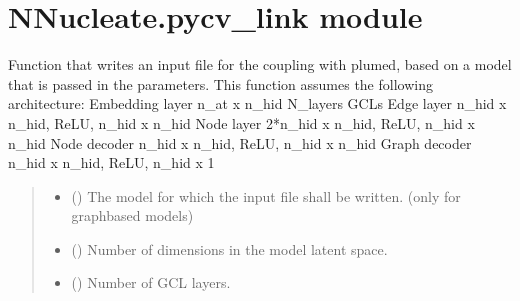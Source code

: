 \documentclass[a4paper,10pt,english]{report}
\begin{document}
\chapter{NNucleate.pycv\_link module}
\label{\detokenize{NNucleate:module-NNucleate.pycv_link}}\label{\detokenize{NNucleate:nnucleate-pycv-link-module}}

\begin{fulllineitems}
\label{\detokenize{NNucleate:NNucleate.pycv_link.write_cv_link}}
\pysigstartsignatures
{}
\pysigstopsignatures
\sphinxAtStartPar
Function that writes an input file for the coupling with plumed, based on a model that is passed in the parameters.
This function assumes the following architecture:
\sphinxhyphen{} Embedding layer n\_at x n\_hid
\sphinxhyphen{} N\_layers GCLs
\sphinxhyphen{} Edge layer n\_hid x n\_hid, ReLU, n\_hid x n\_hid
\sphinxhyphen{} Node layer 2*n\_hid x n\_hid, ReLU, n\_hid x n\_hid
\sphinxhyphen{} Node decoder n\_hid x n\_hid, ReLU, n\_hid x n\_hid
\sphinxhyphen{} Graph decoder n\_hid x n\_hid, ReLU, n\_hid x 1
\begin{quote}\begin{description}
\begin{itemize}
\item {} 
\sphinxAtStartPar
{} ({\hyperref[\detokenize{NNucleate:NNucleate.models.GNNCV}]{}}) \textendash{} The model for which the input file shall be written. (only for graph\sphinxhyphen{}based models)

\item {} 
\sphinxAtStartPar
{} () \textendash{} Number of dimensions in the model latent space.

\item {} 
\sphinxAtStartPar
{} () \textendash{} Number of GCL layers.


\end{itemize}
\end{description}
\end{quote}
\end{fulllineitems}
\end{document}
